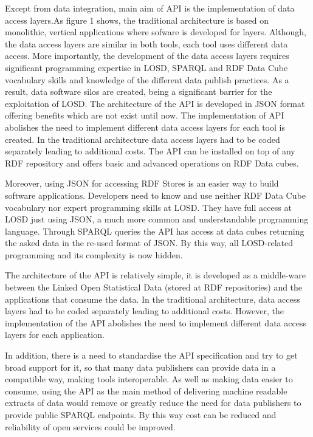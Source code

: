 \documentclass{llncs}
\begin{document}
Except from data integration, main aim of API is the implementation of data access layers.As figure 1 shows, the traditional architecture is based on monolithic, vertical applications where sofware is developed for layers. Although, the data access layers are similar in both
tools, each tool uses different data access. More importantly, the development of the data access layers requires significant programming expertise in LOSD, SPARQL and RDF Data Cube vocabulary skills and knowledge of the different data publish practices. As a result, data software silos are created, being a significant barrier for the
exploitation of LOSD. The architecture of the API is developed in JSON format offering benefits which are not exist until now. The implementation of API abolishes the need to implement different data access layers for each tool is created. In the traditional architecture data access layers had to be coded separately leading to additional costs. The API can be installed on top of any RDF repository and offers basic and advanced operations on RDF Data cubes.
 
Moreover, using JSON for accessing RDF Stores is an easier way to build software applications. Developers need to know and use neither RDF Data Cube vocabulary nor expert programming skills at LOSD. They have full access at LOSD just using JSON, a much more common and understandable programming language. Through SPARQL queries the API has access at data cubes returning the asked data in the re-used format of JSON. By this way, all LOSD-related programming and its complexity is now hidden.

The architecture of the API is relatively simple, it is developed as a middle-ware between the Linked Open Statistical Data (stored at RDF repositories) and the applications that consume the data. In the traditional architecture, data access layers had to be coded separately leading to additional costs. However, the implementation of the API abolishes the need to implement different data access layers for each application. 

In addition, there is a need to standardise the API specification and try to get broad support for it, so that many data publishers can provide data in a compatible way, making tools interoperable. As well as making data easier to consume, using the API as the main method of delivering machine readable extracts of data would remove or greatly reduce the need for data publishers to provide public SPARQL endpoints. By this way cost can be reduced and reliability of open services could be improved.
\end{document}
